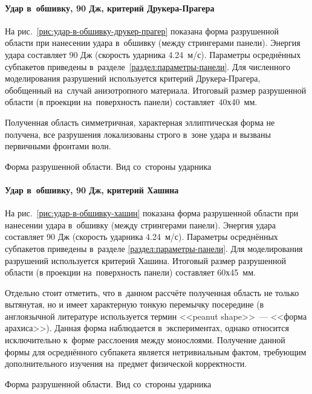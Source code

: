 \documentclass[thesis.tex]{subfiles}
\begin{document}
\paragraph{Удар в~обшивку, 90 Дж, критерий Друкера-Прагера}

На рис.~\ref{рис:удар-в-обшивку-друкер-прагер} показана форма разрушенной области при нанесении удара в~обшивку (между
стрингерами панели). Энергия удара составляет 90 Дж (скорость ударника 4.24~м/с). Параметры осреднённых субпакетов
приведены в~разделе~\ref{раздел:параметры-панели}. Для численного моделирования разрушений используется критерий
Друкера-Прагера,
обобщенный на~случай анизотропного материала. Итоговый размер разрушенной области (в проекции на~поверхность панели)
составляет~40х40~мм.

Полученная область симметричная, характерная эллиптическая форма не получена, все разрушения локализованы строго в~зоне
удара и вызваны первичными фронтами волн.

    {Форма разрушенной области. Вид со~стороны ударника}

\newpage
\paragraph{Удар в~обшивку, 90 Дж, критерий Хашина}

На рис.~\ref{рис:удар-в-обшивку-хашин} показана форма разрушенной области при нанесении удара в~обшивку (между
стрингерами панели). Энергия удара составляет 90 Дж (скорость ударника 4.24~м/с). Параметры осреднённых субпакетов
приведены в~разделе \ref{раздел:параметры-панели}. Для моделирования разрушений используется критерий Хашина. Итоговый
размер разрушенной области (в проекции на~поверхность панели) составляет 60х45~мм.

Отдельно стоит отметить, что в~данном рассчёте полученная область не только вытянутая, но и имеет характерную тонкую
перемычку посередине (в англоязычной литературе используется термин <<peanut shape>>~--- <<форма арахиса>>). Данная форма
наблюдается в~экспериментах, однако относится исключительно к~форме расслоения между монослоями. Получение данной формы
для осреднённого субпакета является нетривиальным фактом, требующим дополнительного изучения на~предмет физической
корректности.

    {Форма разрушенной области. Вид со~стороны ударника}
\end{document}
